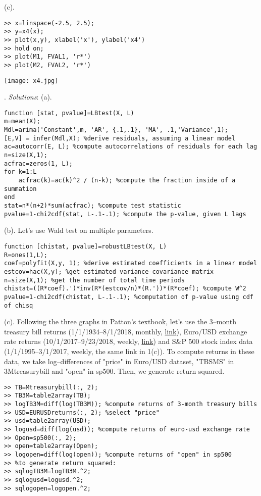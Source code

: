 \documentclass[11pt]{article}
\begin{document}
(c). \begin{lstlisting}
>> x=linspace(-2.5, 2.5);
>> y=x4(x);
>> plot(x,y), xlabel('x'), ylabel('x4')
>> hold on;
>> plot(M1, FVAL1, 'r*')
>> plot(M2, FVAL2, 'r*')
\end{lstlisting}
\texttt{[image: x4.jpg]}

. \textit{Solutions}: (a). \begin{lstlisting}
function [stat, pvalue]=LBtest(X, L)
m=mean(X);
Mdl=arima('Constant',m, 'AR', {.1,.1}, 'MA', .1,'Variance',1);
[E,V] = infer(Mdl,X); %derive residuals, assuming a linear model
ac=autocorr(E, L); %compute autocorrelations of residuals for each lag
n=size(X,1);
acfrac=zeros(1, L);
for k=1:L
    acfrac(k)=ac(k)^2 / (n-k); %compute the fraction inside of a summation
end
stat=n*(n+2)*sum(acfrac); %compute test statistic
pvalue=1-chi2cdf(stat, L-.1-.1); %compute the p-value, given L lags
\end{lstlisting}

(b). Let's use Wald test on multiple parameters.

\begin{lstlisting}
function [chistat, pvalue]=robustLBtest(X, L)
R=ones(1,L);
coef=polyfit(X,y, 1); %derive estimated coefficients in a linear model
estcov=hac(X,y); %get estimated variance-covariance matrix
n=size(X,1); %get the number of total time periods
chistat=((R*coef).')*inv(R*(estcov/n)*(R.'))*(R*coef); %compute W^2
pvalue=1-chi2cdf(chistat, L-.1-.1); %computation of p-value using cdf of chisq
\end{lstlisting}

(c). Following the three graphs in Patton's textbook, let's use the 3--month treasury bill returns (1/1/1934--8/1/2018, monthly, \href{https://fred.stlouisfed.org/series/TB3MS#0}{link}), Euro/USD exchange rate returns (10/1/2017--9/23/2018, weekly, \href{https://www.investing.com/currencies/eur-usd-historical-data}{link}) and  S\&P 500 stock index data (1/1/1995--3/1/2017, weekly, the same link in 1(c)). To compute returns in these data, we take log--differences of "price" in Euro/USD dataset, "TBSMS" in 3Mtreasurybill and "open" in sp500. Then, we generate return squared.

\begin{lstlisting}
>> TB=Mtreasurybill(:, 2);
>> TB3M=table2array(TB);
>> logTB3M=diff(log(TB3M)); %compute returns of 3-month treasury bills
>> USD=EURUSDreturns(:, 2); %select "price"
>> usd=table2array(USD);
>> logusd=diff(log(usd)); %compute returns of euro-usd exchange rate
>> Open=sp500(:, 2);
>> open=table2array(Open);
>> logopen=diff(log(open)); %compute returns of "open" in sp500
>> %to generate return squared:
>> sqlogTB3M=logTB3M.^2;
>> sqlogusd=logusd.^2;
>> sqlogopen=logopen.^2;
\end{lstlisting}
\end{document}
